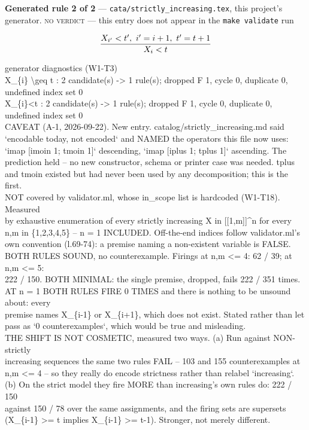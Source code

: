 \documentclass[10pt,a4paper]{article}
\newcommand{\diag}[1]{{\small\itshape\raggedright #1\par}}
\newcommand{\rulebox}[1]{%
  \[\resizebox{\ifdim\width>\linewidth\linewidth\else\width\fi}{!}%
    {$\displaystyle #1$}\]}
\begin{document}
{\small\textbf{Generated rule 2 of 2} --- \texttt{cata/strictly\_increasing.tex}, this project's generator. \textsc{no verdict} --- this entry does not appear in the \texttt{make validate} run\par}
\rulebox{\frac{X_{i'}<t',~i'=i+1,~t'=t+1}{X_{i}<t}}

\diag{generator diagnostics (W1-T3)\\{} X\_\{i\} \textbackslash{}geq t : 2 candidate(s) -> 1 rule(s); dropped F 1, cycle 0, duplicate 0, undefined index set 0\\{} X\_\{i\}<t : 2 candidate(s) -> 1 rule(s); dropped F 1, cycle 0, duplicate 0, undefined index set 0\\{} CAVEAT (A-1, 2026-09-22). New entry. catalog/strictly\_increasing.md said\\{} `encodable today, not encoded` and NAMED the operators this file now uses:\\{} `imap [imoin 1; tmoin 1]` descending, `imap [iplus 1; tplus 1]` ascending. The\\{} prediction held -- no new constructor, schema or printer case was needed. tplus\\{} and tmoin existed but had never been used by any decomposition; this is the first.\\{} NOT covered by validator.ml, whose in\_scope list is hardcoded (W1-T18). Measured\\{} by exhaustive enumeration of every strictly increasing X in [[1,m]]\textasciicircum{}n for every\\{} n,m in \{1,2,3,4,5\} -- n = 1 INCLUDED. Off-the-end indices follow validator.ml's\\{} own convention (l.69-74): a premise naming a non-existent variable is FALSE.\\{} BOTH RULES SOUND, no counterexample. Firings at n,m <= 4: 62 / 39; at n,m <= 5:\\{} 222 / 150. BOTH MINIMAL: the single premise, dropped, fails 222 / 351 times.\\{} AT n = 1 BOTH RULES FIRE 0 TIMES and there is nothing to be unsound about: every\\{} premise names X\_\{i-1\} or X\_\{i+1\}, which does not exist. Stated rather than let\\{} pass as `0 counterexamples`, which would be true and misleading.\\{} THE SHIFT IS NOT COSMETIC, measured two ways. (a) Run against NON-strictly\\{} increasing sequences the same two rules FAIL -- 103 and 155 counterexamples at\\{} n,m <= 4 -- so they really do encode strictness rather than relabel `increasing`.\\{} (b) On the strict model they fire MORE than increasing's own rules do: 222 / 150\\{} against 150 / 78 over the same assignments, and the firing sets are supersets\\{} (X\_\{i-1\} >= t implies X\_\{i-1\} >= t-1). Stronger, not merely different.}
\end{document}
